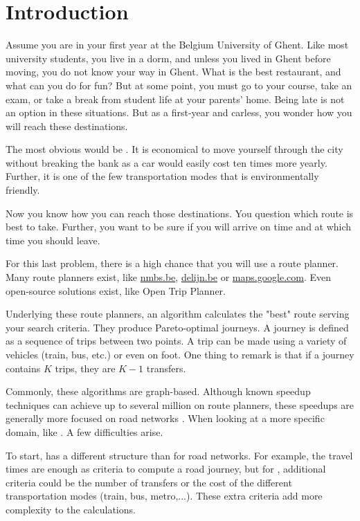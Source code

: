\chapter{Introduction}
\label{chap:intro}

Assume you are in your first year at the Belgium University of Ghent. Like most university students, you live in a dorm, and unless you lived in Ghent before moving, you do not know your way in Ghent. What is the best restaurant, and what can you do for fun? But at some point, you must go to your course, take an exam, or take a break from student life at your parents' home. Being late is not an option in these situations. But as a first-year and carless, you wonder how you will reach these destinations.  


The most obvious would be . It is economical to move yourself through the city without breaking the bank as a car would easily cost ten times more yearly. Further, it is one of the few transportation modes that is environmentally friendly.

Now you know how you can reach those destinations. You question which route is best to take. Further, you want to be sure if you will arrive on time and at which time you should leave. 

For this last problem, there is a high chance that you will use a route planner. Many route planners exist, like \url{nmbs.be}, \url{delijn.be} or \url{maps.google.com}. Even open-source solutions exist, like Open Trip Planner\cite{noauthor_otp_2023}.

Underlying these route planners, an algorithm calculates the "best" route serving your search criteria. They produce Pareto-optimal journeys. A journey is defined as a sequence of trips between two points. A trip can be made using a variety of vehicles (train, bus, etc.) or even on foot. One thing to remark is that if a journey contains $K$ trips, they are $K-1$ transfers. %

Commonly, these algorithms are graph-based. Although known speedup techniques can achieve up to several million on route planners, these speedups are generally more focused on road networks \cite{delling_round-based_2015}. When looking at a more specific domain, like . A few difficulties arise.

To start,  has a different structure than for road networks. For example, the travel times are enough as criteria to compute a road journey, but for , additional criteria could be the number of transfers or the cost of the different transportation modes (train, bus, metro,...). These extra criteria add more complexity to the calculations.

